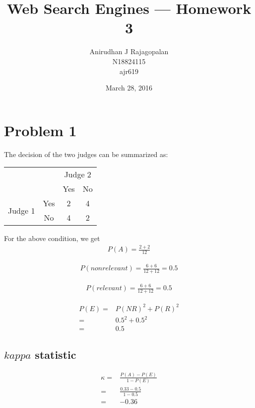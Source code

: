 \documentclass{article}
\begin{document}
\title{Web Search Engines --- Homework 3}
\date{March 28, 2016}
\author{Anirudhan J Rajagopalan\\ N18824115\\ ajr619}
\maketitle

\newpage

\section{Problem 1}

The decision of the two judges can be summarized as:
\begin{center}
  \begin{tabular}{cc|c|c|}
    \cline{3-4}
    & & \multicolumn{2}{c|}{Judge 2} \\ \cline{3-4}
    & & Yes & No \\ \cline{1-4}
    \multicolumn{1}{|c}{\multirow{2}{*}{Judge 1}} & 
    \multicolumn{1}{|c|}{Yes} & 2 & 4 \\ \cline{2-4}
    \multicolumn{1}{|c}{} &
    \multicolumn{1}{|c|}{No} & 4 & 2 \\ \cline{1-4}
  \end{tabular}
\end{center}

For the above condition, we get
\begin{align*}
  P(A) = \frac{2 + 2}{12}
\end{align*}

\begin{align*}
  P(nonrelevant) = \frac{6 + 6}{12 + 12} = 0.5
\end{align*}

\begin{align*}
  P(relevant) = \frac{6 + 6}{12 + 12} = 0.5
\end{align*}

\begin{align*}
  P(E) = & {P(NR)}^{2} + {P(R)}^{2} \\
  =& 0.5^{2} + 0.5^{2} \\
  =& 0.5
\end{align*}

\subsection{$kappa$ statistic}

\begin{align*}
  \kappa =& \frac{P(A) - P(E)}{1 - P(E)} \\
  =& \frac{0.33 - 0.5}{1 - 0.5} \\
  =& -0.36
\end{align*}
\end{document}

